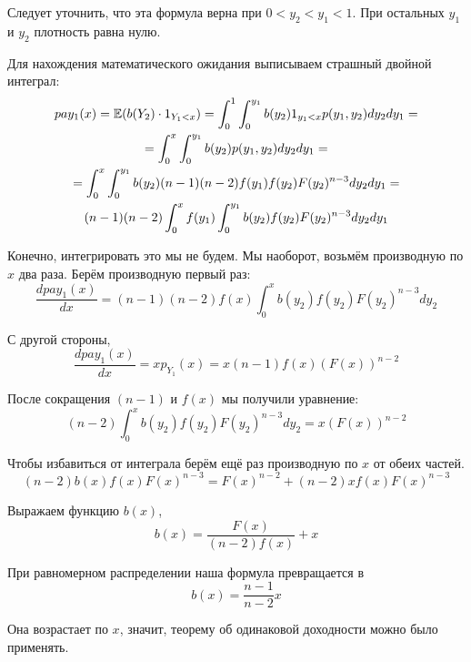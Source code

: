 \begin{myex}
Следует уточнить, что эта формула верна при $0<y_{2}<y_{1}<1$. При остальных $ y_{1} $ и $ y_{2} $ плотность равна нулю.

Для нахождения математического ожидания выписываем страшный двойной интеграл:
\begin{multline}
pay_{1}(x)=\operatorname{\mathbb{E}}(b(Y_{2})\cdot 1_{Y_{1}<x})=\int_{0}^{1}\int_{0}^{y_{1}} b(y_{2})1_{y_{1}<x} p(y_{1},y_{2})dy_{2}dy_{1}=\\
=\int_{0}^{x}\int_{0}^{y_{1}} b(y_{2})p(y_{1},y_{2})dy_{2}dy_{1}=\\
=\int_{0}^{x}\int_{0}^{y_{1}} b(y_{2}) (n-1)(n-2)f(y_{1})f(y_{2})F(y_{2})^{n-3} dy_{2}dy_{1}=\\
(n-1)(n-2)\int_{0}^{x}f(y_{1})\int_{0}^{y_{1}} b(y_{2}) f(y_{2})F(y_{2})^{n-3} dy_{2}dy_{1}
\end{multline}

Конечно, интегрировать это мы не будем. Мы наоборот, возьмём производную по $x$ два раза. Берём производную первый раз:
\begin{equation}
\frac{dpay_{1}(x)}{dx}=(n-1)(n-2)f(x)\int_{0}^{x} b(y_{2}) f(y_{2})F(y_{2})^{n-3} dy_{2}
\end{equation}

С другой стороны,
\begin{equation}
\frac{dpay_{1}(x)}{dx}=xp_{Y_{1}}(x)=x(n-1)f(x)(F(x))^{n-2}
\end{equation}

После сокращения $ (n-1) $ и $ f(x) $ мы получили уравнение:
\begin{equation}
(n-2)\int_{0}^{x} b(y_{2}) f(y_{2})F(y_{2})^{n-3} dy_{2}=x(F(x))^{n-2}
\end{equation}

Чтобы избавиться от интеграла берём ещё раз производную по $ x $ от обеих частей.
\begin{equation}
(n-2) b(x) f(x)F(x)^{n-3}=F(x)^{n-2}+(n-2)xf(x)F(x)^{n-3}
\end{equation}

Выражаем функцию $ b(x) $,
\begin{equation}
b(x)=\frac{F(x)}{(n-2)f(x)}+x
\end{equation}

При равномерном распределении наша формула превращается в
\begin{equation}
b(x)=\frac{n-1}{n-2}x
\end{equation}

Она возрастает по $ x $, значит, теорему об одинаковой доходности можно было применять.
\end{myex}


